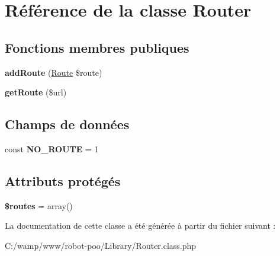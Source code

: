 \hypertarget{class_library_1_1_router}{\section{Référence de la classe Router}
\label{class_library_1_1_router}
}
\subsection*{Fonctions membres publiques}
\begin{DoxyCompactItemize}
\item 
\hypertarget{class_library_1_1_router_a7c2a9704f7a30c808d87ac5ccddc1c21}{{\bfseries add\+Route} (\hyperlink{class_library_1_1_route}{Route} \$route)}\label{class_library_1_1_router_a7c2a9704f7a30c808d87ac5ccddc1c21}

\item 
\hypertarget{class_library_1_1_router_a192e3ebafc570b3e067d49924535d197}{{\bfseries get\+Route} (\$url)}\label{class_library_1_1_router_a192e3ebafc570b3e067d49924535d197}

\end{DoxyCompactItemize}
\subsection*{Champs de données}
\begin{DoxyCompactItemize}
\item 
\hypertarget{class_library_1_1_router_a60e62d9aa6f8a6d5a23175ced6377c29}{const {\bfseries N\+O\+\_\+\+R\+O\+U\+T\+E} = 1}\label{class_library_1_1_router_a60e62d9aa6f8a6d5a23175ced6377c29}

\end{DoxyCompactItemize}
\subsection*{Attributs protégés}
\begin{DoxyCompactItemize}
\item 
\hypertarget{class_library_1_1_router_a8f7eb04a54e0f0bfc0cedeb9899ce4a8}{{\bfseries \$routes} = array()}\label{class_library_1_1_router_a8f7eb04a54e0f0bfc0cedeb9899ce4a8}

\end{DoxyCompactItemize}


La documentation de cette classe a été générée à partir du fichier suivant \+:\begin{DoxyCompactItemize}
\item 
C\+:/wamp/www/robot-\/poo/\+Library/Router.\+class.\+php\end{DoxyCompactItemize}
